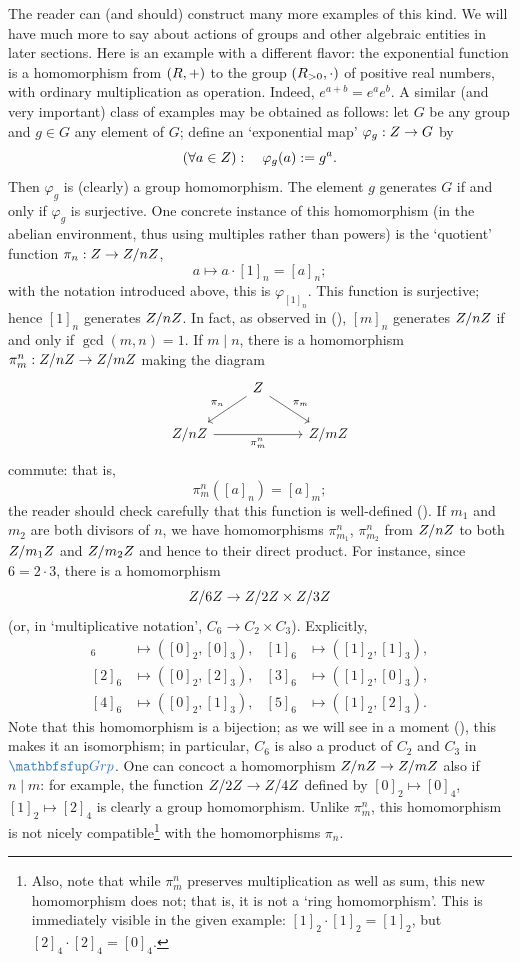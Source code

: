 The reader can (and should) construct many more examples of this
kind. We will have much more to say about actions of groups and other
algebraic entities in later sections.  Here is an example with a
different flavor: the exponential function is a homomorphism from
$(R, +)$ to the group $(R_{>0}, \cdot)$ of positive real numbers,
with ordinary multiplication as operation. Indeed,
$e^{a+b} = e^a e^b$. A similar (and very important) class of examples
may be obtained as follows: let $G$ be any group and $g \in G$ any
element of $G$; define an `exponential map' $\varphi_g : Z \to G$ by
\[
  (\forall a \in Z) : \quad \varphi_g(a) \mathrel{:=} g^a.
\]
Then $\varphi_g$ is (clearly) a group homomorphism. The element $g$
generates $G$ if and only if $\varphi_g$ is surjective.  One concrete
instance of this homomorphism (in the abelian environment, thus using
multiples rather than powers) is the `quotient' function
$\pi_n : Z \to Z/nZ$,
\[
  a \mapsto a \cdot [1]_n = [a]_n;
\]
with the notation introduced above, this is $\varphi_{[1]_n}$. This
function is surjective; hence $[1]_n$ generates $Z/nZ$. In fact, as
observed in
(), $[m]_n$ generates $Z/nZ$ if
and only if $\gcd(m, n) = 1$.  If $m \mid n$, there is a homomorphism
$\pi^n_m : Z/nZ \to Z/mZ$ making the diagram
\[
  \begin{tikzcd}
    & \Z \arrow[dl, "\pi_n"'] \arrow[dr, "\pi_m"] & \\
    \Z/n\Z \arrow[rr, "\pi^n_m"'] & & \Z/m\Z
  \end{tikzcd}
\]
commute: that is,
\[
  \pi^n_m([a]_n) = [a]_m;
\]
the reader should check carefully that this function is well-defined
().  If $m_1$ and $m_2$ are both
divisors of $n$, we have homomorphisms $\pi^n_{m_1}$, $\pi^n_{m_2}$
from $Z/nZ$ to both $Z/m_1Z$ and $Z/m_2Z$ and hence to their
direct product. For instance, since $6 = 2 \cdot 3$, there is a
homomorphism
\[
  Z/6Z \to Z/2Z \times Z/3Z
\]
(or, in `multiplicative notation', $C_6 \to C_2 \times
C_3$). Explicitly,
\begin{align*}
  [0]_6 &\mapsto ([0]_2, [0]_3), & [1]_6 &\mapsto ([1]_2, [1]_3), \\
  [2]_6 &\mapsto ([0]_2, [2]_3), & [3]_6 &\mapsto ([1]_2, [0]_3), \\
  [4]_6 &\mapsto ([0]_2, [1]_3), & [5]_6 &\mapsto ([1]_2, [2]_3).
\end{align*}
Note that this homomorphism is a bijection; as we will see in a moment
(), this makes it an isomorphism;
in particular, $C_6$ is also a product of $C_2$ and $C_3$ in
$\categ{Grp}$.  One can concoct a homomorphism $Z/nZ \to Z/mZ$
also if $n \mid m$: for example, the function $Z/2Z \to Z/4Z$
defined by $[0]_2 \mapsto [0]_4$, $[1]_2 \mapsto [2]_4$ is clearly a
group homomorphism. Unlike $\pi^n_m$, this homomorphism is not nicely
compatible\footnote{Also, note that while $\pi^n_m$ preserves
  multiplication as well as sum, this new homomorphism does not; that
  is, it is not a `ring homomorphism'. This is immediately visible in
  the given example: $[1]_2 \cdot [1]_2 = [1]_2$, but
  $[2]_4 \cdot [2]_4 = [0]_4$.}  with the homomorphisms $\pi_n$.

